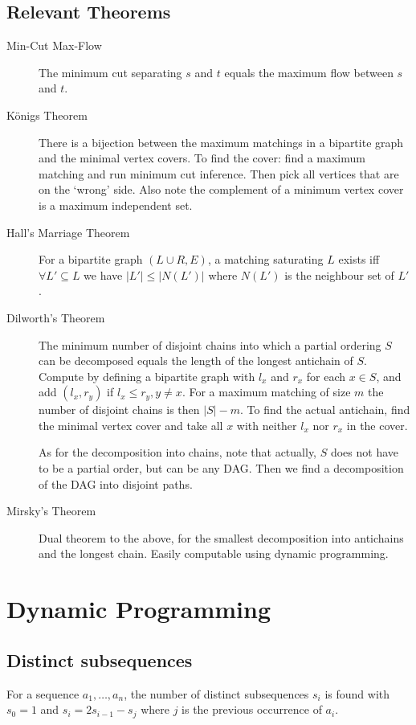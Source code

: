 \documentclass[
	a4paper,
	landscape,
	10pt,
	article
]{article}
\begin{document}
\subsection{Relevant Theorems}
\begin{description}
	\item[Min-Cut Max-Flow] The minimum cut separating $s$ and $t$ equals the
		maximum flow between $s$ and $t$.
	\item[K\"onigs Theorem] There is a bijection between the maximum matchings
		in a bipartite graph and the minimal vertex covers. To find the cover:
		find a maximum matching and run minimum cut inference. Then pick all
		vertices that are on the `wrong' side. Also note the complement of a
		minimum vertex cover is a maximum independent set.
	\item[Hall's Marriage Theorem] For a bipartite graph $(L \cup R, E)$, a
		matching saturating $L$ exists iff $\forall L' \subseteq L$ we have
		$|L'| \leq |N(L')|$ where $N(L')$ is the neighbour set of $L'$.
	\item[Dilworth's Theorem] The minimum number of disjoint chains into which
		a partial ordering $S$ can be decomposed equals the length of
		the longest antichain of
		$S$. Compute by defining a bipartite graph with $l_x$ and $r_x$ for
		each $x \in S$, and add $(l_x, r_y)$ if $l_x \leq r_y, y \neq x$. For
		a maximum matching of size $m$ the number of disjoint chains is then
		$|S|-m$. To find the actual antichain, find the minimal vertex cover
		and take all $x$ with neither $l_x$ nor $r_x$ in the cover.
		
		As for the decomposition into chains,
		note that actually, $S$ does not have to be a partial order, but can be
		any DAG. Then we find a decomposition of the DAG into disjoint paths.
	\item[Mirsky's Theorem] Dual theorem to the above, for the smallest
		decomposition into antichains and the longest chain. Easily computable
		using dynamic programming.
\end{description}

\section{Dynamic Programming}

\subsection{Distinct subsequences}
For a sequence $a_1, \dots, a_n$, the number of distinct subsequences $s_i$
is found with $s_0 = 1$ and $s_i = 2 s_{i-1} - s_j$ where $j$ is the previous
occurrence of $a_i$.
\end{document}
